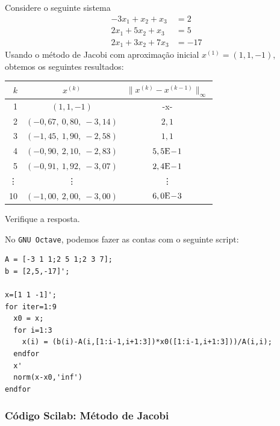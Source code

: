 \begin{ex}
  Considere o seguinte sistema
  \begin{equation}
    \begin{split}
      -3x_1 + x_2 + x_3 &= 2\\
      2x_1 + 5x_2 + x_3 &= 5\\
      2x_1 + 3x_2 + 7x_3 &= -17
    \end{split}
  \end{equation}
Usando o método de Jacobi com aproximação inicial $x^{(1)} = (1, 1, -1)$, obtemos os seguintes resultados:
\begin{center}
  \begin{tabular}{rcc}\hline
    $k$ & $x^{(k)}$ & $\|x^{(k)}-x^{(k-1)}\|_\infty$\\\hline
    1   & $(1, 1, -1)$ & -x-\\
    2   & $(-0,67,~0,80,~-3,14)$ & $2,1$\\
    3   & $(-1,45,~1,90,~-2,58)$ & $1,1$\\
    4   & $(-0,90,~2,10,~-2,83)$ & $5,5\mathrm{E}\!-\!1$\\
    5   & $(-0,91,~1,92,~-3,07)$ & $2,4\mathrm{E}\!-\!1$\\
    \vdots & \vdots & \vdots\\
    10  & $(-1,00,~2,00,~-3,00)$ & $6,0\mathrm{E}\!-\!3$\\\hline
  \end{tabular}
\end{center}
Verifique a resposta.

\ifisscilab
\construirScilab
\fi
\ifisoctave
No \verb+GNU Octave+, podemos fazer as contas com o seguinte script:
\begin{verbatim}
A = [-3 1 1;2 5 1;2 3 7];
b = [2,5,-17]';

x=[1 1 -1]';
for iter=1:9
  x0 = x;
  for i=1:3
    x(i) = (b(i)-A(i,[1:i-1,i+1:3])*x0([1:i-1,i+1:3]))/A(i,i);
  endfor
  x'
  norm(x-x0,'inf')
endfor
\end{verbatim}
\fi
\end{ex}

\ifisscilab
\subsubsection{Código Scilab: Método de Jacobi}


\fi
\ifisoctave

